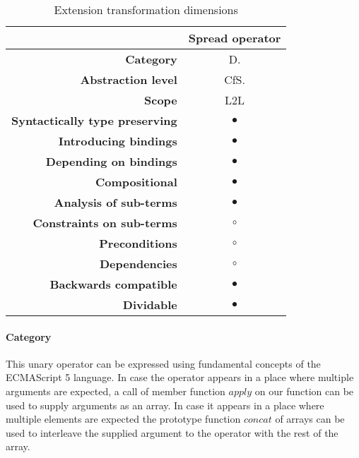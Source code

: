 \begin{table}[h]
\centering
\caption{Extension transformation dimensions}
\label{spread-oeprator-table}
\begin{tabular}{@{}rc@{}}
\toprule
                                       & \multicolumn{1}{l}{\textbf{Spread operator}} \\ \midrule
\textbf{Category}                      & D.
\\
\textbf{Abstraction level}          & CfS.                          \\
\textbf{Scope}                         & L2L                               \\
\textbf{Syntactically type preserving} & $\bullet$                                          \\
\textbf{Introducing bindings}          & $\bullet$                                          \\%
\textbf{Depending on bindings}         & $\bullet$                                           \\
\textbf{Compositional}                 & $\bullet$                                          \\
\textbf{Analysis of sub-terms}          & $\bullet$                                          \\
\textbf{Constraints on sub-terms}       & $\circ$                                           \\
\textbf{Preconditions}                 & $\circ$                                          \\
\textbf{Dependencies}                  & $\circ$                                           \\
\textbf{Backwards compatible}          & $\bullet$                                          \\
\textbf{Dividable}                     & $\bullet$                                           \\ \bottomrule
\end{tabular}
\end{table}

\paragraph{Category}
This unary operator can be expressed using fundamental concepts of the ECMAScript 5 language. In case the operator appears in a place where multiple arguments are expected, a call of member function $apply$ on our function can be used to supply arguments as an array. In case it appears in a place where multiple elements are expected the prototype function $concat$ of arrays can be used to interleave the supplied argument to the operator with the rest of the array. 

